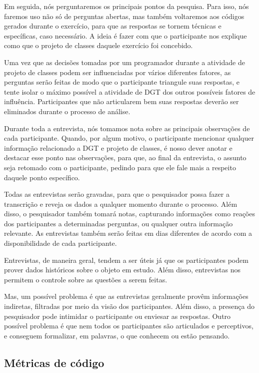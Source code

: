 Em seguida, nós perguntaremos os principais pontos da pesquisa.
Para isso, nós faremos uso não só de perguntas abertas, mas também
voltaremos aos códigos gerados durante o exercício, para que as respostas se tornem técnicas e
específicas, caso necessário. A ideia é fazer com que o participante nos explique
como que o projeto de classes daquele exercício foi concebido.

Uma vez que as decisões tomadas por um programador durante a atividade de projeto de classes
podem ser influenciadas por vários diferentes fatores, 
as perguntas serão feitas de modo que o participante triangule suas respostas,
e tente isolar o máximo possível a atividade de DGT dos outros possíveis fatores
de influência. Participantes que não articularem bem suas respostas deverão ser eliminados
durante o processo de análise.

Durante toda a entrevista, nós tomamos nota sobre as principais observações
de cada participante. Quando, por algum motivo, o participante mencionar qualquer
informação relacionado a DGT e projeto de classes, é nosso dever anotar e destacar esse ponto
nas observações, para que, ao final da entrevista, o assunto seja retomado com 
o participante, pedindo para que ele fale mais a respeito daquele ponto específico.

Todas as entrevistas serão gravadas, para que o pesquisador possa fazer a
transcrição e reveja os dados a qualquer momento durante o processo. Além disso,
o pesquisador também tomará notas, capturando informações como reações dos 
participantes a determinadas perguntas, ou qualquer outra informação relevante. 
As entrevistas também serão feitas em dias diferentes de acordo com a disponibilidade
de cada participante.

Entrevistas, de maneira geral, tendem a ser úteis já que os participantes podem prover dados históricos 
sobre o objeto em estudo.
Além disso, entrevistas nos permitem o controle sobre as questões a serem feitas.

Mas, um possível problema é que as entrevistas geralmente provêm informações indiretas, 
filtradas por meio da visão dos participantes. Além disso, a presença do pesquisador pode 
intimidar o participante ou enviesar as respostas.
Outro possível problema é que nem todos os participantes são articulados e perceptivos, e conseguem
formalizar, em palavras, o que conhecem ou estão pensando.


\subsection{Métricas de código}

